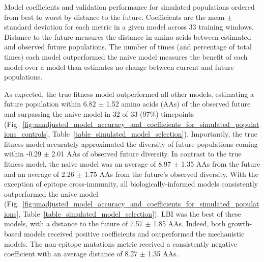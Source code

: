 \begin{table}[ht]
  \begin{center}
    
    \caption{
      Model coefficients and validation performance for simulated populations ordered from best to worst by distance to the future.
      Coefficients are the mean $\pm$ standard deviation for each metric in a given model across 33 training windows.
      Distance to the future measures the distance in amino acids between estimated and observed future populations.
      The number of times (and percentage of total times) each model outperformed the naive model measures the benefit of each model over a model than estimates no change between current and future populations.
    }
    \label{table_simulated_model_selection}
  \end{center}
\end{table}

As expected, the true fitness model outperformed all other models, estimating a future population within 6.82 $\pm$ 1.52 amino acids (AAs) of the observed future and surpassing the naive model in 32 of 33 (97\%) timepoints (Fig.~\ref{fig:unadjusted_model_accuracy_and_coefficients_for_simulated_populations_controls}, Table~\ref{table_simulated_model_selection}).
Importantly, the true fitness model accurately approximated the diversity of future populations coming within -0.29 $\pm$ 2.01 AAs of observed future diversity.
In contrast to the true fitness model, the naive model was an average of 8.97 $\pm$ 1.35 AAs from the future and an average of 2.26 $\pm$ 1.75 AAs from the future's observed diversity.
With the exception of epitope cross-immunity, all biologically-informed models consistently outperformed the naive model (Fig.~\ref{fig:unadjusted_model_accuracy_and_coefficients_for_simulated_populations}, Table~\ref{table_simulated_model_selection}).
LBI was the best of these models, with a distance to the future of 7.57 $\pm$ 1.85 AAs.
Indeed, both growth-based models received positive coefficients and outperformed the mechanistic models.
The non-epitope mutations metric received a consistently negative coefficient with an average distance of 8.27 $\pm$ 1.35 AAs.

